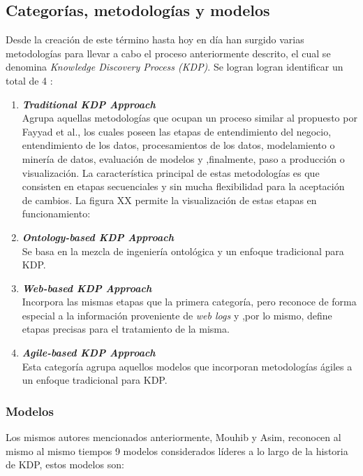\subsection{Categorías, metodologías y modelos \label{sec:problem_categories}}
Desde la creación de este término hasta hoy en día han surgido varias metodologías para llevar a cabo el proceso anteriormente descrito, el cual se denomina \textit{Knowledge Discovery Process (KDP)}. Se logran logran identificar un total de 4 \cite{knowledge_discovery}:

\begin{enumerate}
  \item \textbf{\textit{Traditional KDP Approach}}\mbox{}\\ Agrupa aquellas metodologías que ocupan un proceso similar al propuesto por Fayyad et al., los cuales poseen las etapas de entendimiento del negocio, entendimiento de los datos, procesamientos de los datos, modelamiento o minería de datos, evaluación de modelos y ,finalmente, paso a producción o visualización. La característica principal de estas metodologías es que consisten en etapas secuenciales y sin mucha flexibilidad para la aceptación de cambios. La figura XX permite la visualización de estas etapas en funcionamiento:
  \item \textbf{\textit{Ontology-based KDP Approach}}\mbox{}\\ Se basa en la mezcla de ingeniería ontológica  y un enfoque tradicional para KDP.
  \item \textbf{\textit{Web-based KDP Approach}} \mbox{} \\ Incorpora las mismas etapas que la primera categoría, pero reconoce de forma especial a la información proveniente de \textit{web logs} y ,por lo mismo, define etapas precisas para el tratamiento de la misma.
  \item \textbf{\textit{Agile-based KDP Approach}} \mbox{} \\  Esta categoría agrupa aquellos modelos que incorporan metodologías ágiles a un enfoque tradicional para KDP.
\end{enumerate}


\subsubsection{Modelos \label{sec:knowledge_discovery_models}}

Los mismos autores mencionados anteriormente, Mouhib y Asim, reconocen al mismo al mismo tiempos 9 modelos considerados líderes a lo largo de la historia de KDP, estos modelos son:

